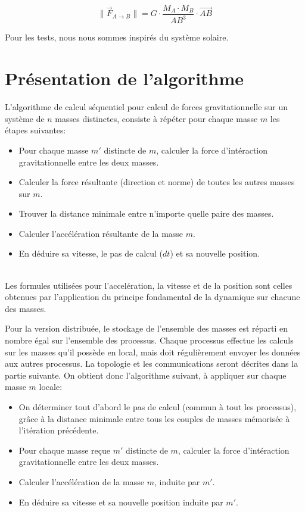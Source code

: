 \documentclass[a4paper,11pt]{article}
\begin{document}
\[
\| \vec{F}_{A\rightarrow B} \| = G \cdot \frac{M_A \cdot M_B}{\mathit{AB^3}} \cdot \mathit{\vec{AB}}
\]

Pour les tests, nous nous sommes inspirés du système solaire.

\section{Présentation de l'algorithme}
L'algorithme de calcul séquentiel pour calcul de forces gravitationnelle sur un système de $n$ masses distinctes, consiste à répéter pour chaque masse $m$ les étapes suivantes:\\

\begin{itemize}
\item Pour chaque masse $m'$ distincte de $m$, calculer la force d'intéraction gravitationnelle entre les deux masses.
\item Calculer la force résultante (direction et norme) de toutes les autres masses sur $m$.
\item Trouver la distance minimale entre n'importe quelle paire des masses.
\item Calculer l'accélération résultante de la masse $m$.
\item En déduire sa vitesse, le pas de calcul ($dt$) et sa nouvelle position.
\end{itemize}
\\
Les formules utilisées pour l'accelération, la vitesse et de la position sont celles obtenues par l'application du principe fondamental de la dynamique sur chacune des masses.

Pour la version distribuée, %
le stockage de l'ensemble des masses est réparti en nombre égal sur l'ensemble des processus. Chaque processus effectue les calculs sur les masses qu'il possède en local, mais doit régulièrement envoyer les données aux autres processus. La topologie et les communications seront décrites dans la partie suivante. On obtient donc l'algorithme suivant, à appliquer sur chaque masse $m$ locale:\\
\begin{itemize}
\item On déterminer tout d'abord le pas de calcul (commun à tout les processus), grâce à la distance minimale entre tous les couples de masses mémorisée à l'itération précédente.
\item Pour chaque masse  reçue $m'$ distincte de $m$, calculer la force d'intéraction gravitationnelle entre les deux masses.
\item Calculer l'accélération de la masse $m$, induite par $m'$.
\item En déduire sa vitesse et sa nouvelle position induite par $m'$.
\end{itemize}
\end{document}
